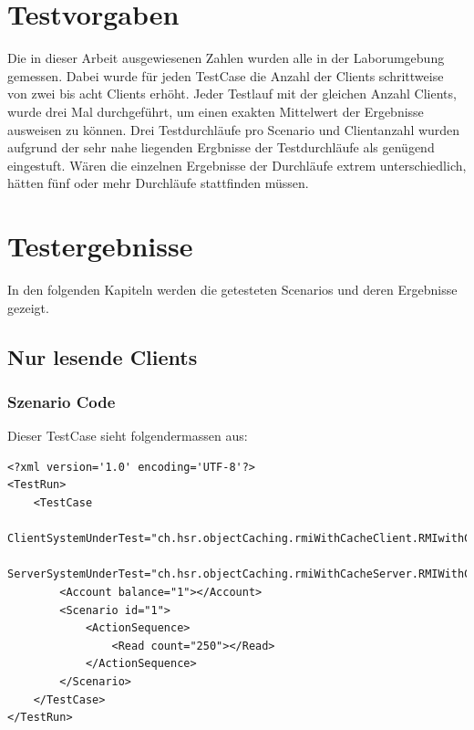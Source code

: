 \section{Testvorgaben}
Die in dieser Arbeit ausgewiesenen Zahlen wurden alle in der Laborumgebung gemessen. Dabei wurde für jeden TestCase die Anzahl der Clients schrittweise von zwei bis acht Clients erhöht. Jeder Testlauf mit der gleichen Anzahl Clients, wurde drei Mal durchgeführt, um einen exakten Mittelwert der Ergebnisse ausweisen zu können. Drei Testdurchläufe pro Scenario und Clientanzahl wurden aufgrund der sehr nahe liegenden Ergbnisse der Testdurchläufe als genügend eingestuft. Wären die einzelnen Ergebnisse der Durchläufe extrem unterschiedlich, hätten fünf oder mehr Durchläufe stattfinden müssen.

\section{Testergebnisse}
In den folgenden Kapiteln werden die getesteten Scenarios und deren Ergebnisse gezeigt. 

\subsection{Nur lesende Clients}
\subsubsection{Szenario Code}
Dieser TestCase sieht folgendermassen aus:
\begin{lstlisting}[breaklines=true]
<?xml version='1.0' encoding='UTF-8'?>
<TestRun>
	<TestCase
		ClientSystemUnderTest="ch.hsr.objectCaching.rmiWithCacheClient.RMIwithCacheClientSystem"
		ServerSystemUnderTest="ch.hsr.objectCaching.rmiWithCacheServer.RMIWithCacheServerSystem">
		<Account balance="1"></Account>
		<Scenario id="1">
			<ActionSequence>
				<Read count="250"></Read>
			</ActionSequence>
		</Scenario>
	</TestCase>
</TestRun>
\end{lstlisting}

